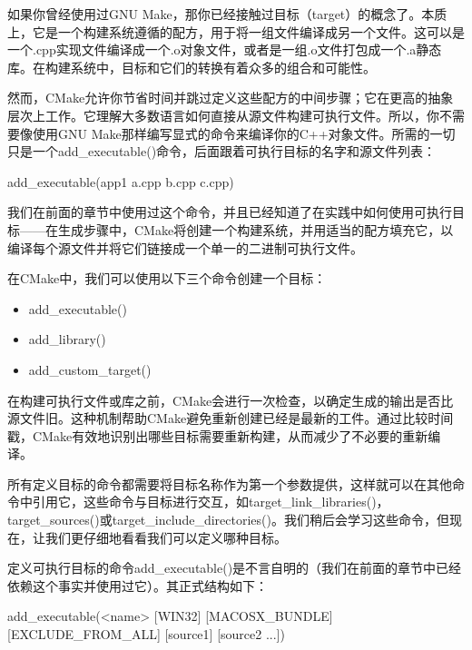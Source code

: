 如果你曾经使用过GNU Make，那你已经接触过目标（target）的概念了。本质上，它是一个构建系统遵循的配方，用于将一组文件编译成另一个文件。这可以是一个.cpp实现文件编译成一个.o对象文件，或者是一组.o文件打包成一个.a静态库。在构建系统中，目标和它们的转换有着众多的组合和可能性。

然而，CMake允许你节省时间并跳过定义这些配方的中间步骤；它在更高的抽象层次上工作。它理解大多数语言如何直接从源文件构建可执行文件。所以，你不需要像使用GNU Make那样编写显式的命令来编译你的C++对象文件。所需的一切只是一个add\_executable()命令，后面跟着可执行目标的名字和源文件列表：

\begin{cmake}
add_executable(app1 a.cpp b.cpp c.cpp)
\end{cmake}

我们在前面的章节中使用过这个命令，并且已经知道了在实践中如何使用可执行目标——在生成步骤中，CMake将创建一个构建系统，并用适当的配方填充它，以编译每个源文件并将它们链接成一个单一的二进制可执行文件。

在CMake中，我们可以使用以下三个命令创建一个目标：

\begin{itemize}
\item
add\_executable()

\item
add\_library()

\item
add\_custom\_target()
\end{itemize}

在构建可执行文件或库之前，CMake会进行一次检查，以确定生成的输出是否比源文件旧。这种机制帮助CMake避免重新创建已经是最新的工件。通过比较时间戳，CMake有效地识别出哪些目标需要重新构建，从而减少了不必要的重新编译。

所有定义目标的命令都需要将目标名称作为第一个参数提供，这样就可以在其他命令中引用它，这些命令与目标进行交互，如target\_link\_libraries()，target\_sources()或target\_include\_directories()。我们稍后会学习这些命令，但现在，让我们更仔细地看看我们可以定义哪种目标。


定义可执行目标的命令add\_executable()是不言自明的（我们在前面的章节中已经依赖这个事实并使用过它）。其正式结构如下：

\begin{shell}
add_executable(<name> [WIN32] [MACOSX_BUNDLE]
                [EXCLUDE_FROM_ALL]
                [source1] [source2 ...])
\end{shell}

